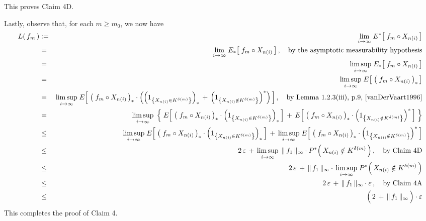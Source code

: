 This proves Claim 4D.

\vskip 0.8cm
\noindent
Lastly, observe that, for each $m \geq m_{0}$, we now have
\begin{eqnarray*}
L(\,f_{m}\,)
&:=&
	\underset{i\rightarrow\infty}{\lim}\; E^{*}\!\left[\; f_{m} \circ X_{n(i)} \,\right]
\\
&=&
	\underset{i\rightarrow\infty}{\lim}\; E_{*}\!\left[\; f_{m} \circ X_{n(i)} \,\right],
	\quad
	\textnormal{by the asymptotic measurability hypothesis}
\\
&=&
	\underset{i\rightarrow\infty}{\limsup}\; E_{*}\!\left[\; f_{m} \circ X_{n(i)} \,\right]
\\
&=&
	\underset{i\rightarrow\infty}{\limsup}\; E\!\left[\; \left(\;f_{m} \circ X_{n(i)}\,\right)_{*} \,\right]
\\
&=&
	\underset{i\rightarrow\infty}{\limsup}\;
	E\!\left[\;
		\left(\;f_{m} \circ X_{n(i)}\,\right)_{*}
		\cdot
		\left(
			\left(1_{\left\{X_{n(i)} \in K^{\delta(m)}\right\}}\right)_{*}
			\,+\,
			\left(1_{\left\{X_{n(i)} \notin K^{\delta(m)}\right\}}\right)^{*}
		\right)
	\,\right],
	\quad\textnormal{by Lemma 1.2.3(iii), p.9, \cite{vanDerVaart1996}}
\\
&=&
	\underset{i\rightarrow\infty}{\limsup}\;
	\left\{\;
		E\!\left[\;
			\left(\;f_{m} \circ X_{n(i)}\,\right)_{*}
			\cdot
			\left(1_{\left\{X_{n(i)} \in K^{\delta(m)}\right\}}\right)_{*}
		\,\right]
		\, + \,
		E\!\left[\;
			\left(\;f_{m} \circ X_{n(i)}\,\right)_{*}
			\cdot
			\left(1_{\left\{X_{n(i)} \notin K^{\delta(m)}\right\}}\right)^{*}
		\,\right]
	\;\right\}
\\
&\leq&
	\underset{i\rightarrow\infty}{\limsup}\;
	E\!\left[\;
		\left(\;f_{m} \circ X_{n(i)}\,\right)_{*}
		\cdot
		\left(1_{\left\{X_{n(i)} \in K^{\delta(m)}\right\}}\right)_{*}
	\,\right]
	\, + \,
	\underset{i\rightarrow\infty}{\limsup}\;
	E\!\left[\;
		\left(\;f_{m} \circ X_{n(i)}\,\right)_{*}
		\cdot
		\left(1_{\left\{X_{n(i)} \notin K^{\delta(m)}\right\}}\right)^{*}
	\,\right]
\\
&\leq&
	2\,\varepsilon
	\, + \,
	\underset{i\rightarrow\infty}{\limsup}\;\,
	\Vert\,f_{1}\,\Vert_{\infty} \cdot P^{*}\!\left(\,X_{n(i)} \notin K^{\delta(m)}\,\right),
	\quad
	\textnormal{by Claim 4D}
\\
&\leq&
	2\,\varepsilon
	\, + \,
	\Vert\,f_{1}\,\Vert_{\infty} \cdot \,
	\underset{i\rightarrow\infty}{\limsup}\;
	P^{*}\!\left(\,X_{n(i)} \notin K^{\delta(m)}\,\right)
\\
&\leq&
	2\,\varepsilon \, + \, \Vert\,f_{1}\,\Vert_{\infty} \cdot \varepsilon\,,
	\quad
	\textnormal{by Claim 4A}
\\
&\leq&
	\left(\,2 \, \overset{{\color{white}.}}{+} \, \Vert\,f_{1}\,\Vert_{\infty} \,\right) \cdot \varepsilon
\end{eqnarray*}
This completes the proof of Claim 4.

